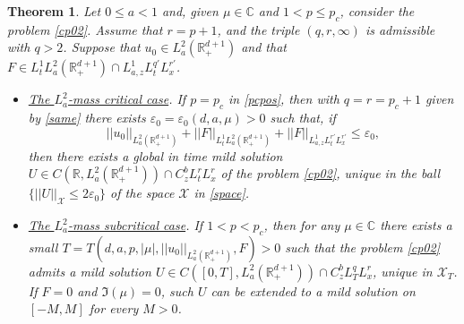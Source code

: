 \documentclass[10pt,a4paper]{amsart}
\newtheorem{theorem}{Theorem}
\newcommand{\C}{\mathbb{C}}
\def \R {\mathbb{R}}
\def \RN {\mathbb{R}_+^{d+1}}
\newcommand{\XT}{\mathcal{X}_T}
\newcommand{\Xs}{\mathcal X}
\newcommand{\ve}{\varepsilon}
\begin{document}
\begin{theorem}\label{T:well}
Let $0\le a<1$ and, given $\mu\in \C$ and $1<p\le p_c$, consider the problem \eqref{cp02}. Assume that $r = p+1$, and the triple $(q,r,\infty)$ is admissible with $q>2$. Suppose that $u_0\in L^2_a(\RN)$ and that  $F\in L^1_t L^2_a(\RN)\cap L^1_{a,z} L^{q'}_t L^{r'}_x $.
\begin{itemize}
\item[(1)] \underline{\emph{The $L^2_a$-mass critical case}}. If $p = p_c$ in \eqref{pcpos}, then with $q = r = p_c+1$ given by \eqref{same} there exists $\ve_0 = \ve_0(d,a,\mu)>0$ such that, if
\[
||u_0||_{L^2_a(\RN)} + ||F||_{L^1_t L^2_a(\RN)} + ||F||_{L^1_{a,z} L^{r'}_t L^{r'}_x} \le \ve_0,
\]
then there exists a global in time mild solution 
$U\in C(\R,L^2_a(\RN)) \cap C^{b}_z L^r_t L^r_x $ 
of the problem \eqref{cp02}, unique in the ball $\{||U||_{\Xs}\le 2\ve_0\}$ of the space $\Xs$ in \eqref{space}.
\item[(2)] \underline{\emph{The $L^2_a$-mass subcritical case}}. If $1<p<p_c$, then for any $\mu\in \C$ there exists a small $T = T(d,a,p,|\mu|,||u_0||_{L^2_a(\RN)},F)>0$ such that the problem \eqref{cp02} admits a mild solution $U\in C([0,T],L^2_a(\RN)) \cap C^{b}_z L^q_T L^r_x$, unique in $\XT$. 
If $F= 0$ and $\Im(\mu) = 0$, such $U$ can be extended to a mild solution on $[-M,M]$ for every $M>0$.
\end{itemize}
\end{theorem}
\end{document}
